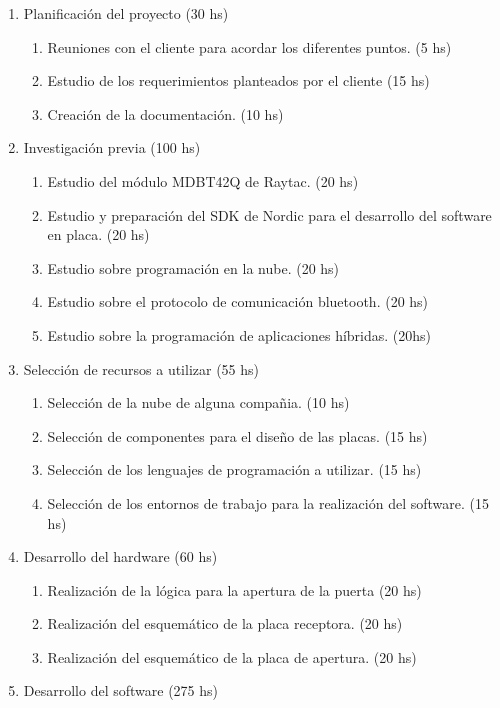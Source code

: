 \documentclass[11pt]{charter}
\begin{document}
\begin{enumerate}
\item Planificación del proyecto (30 hs)
	\begin{enumerate}
	\item Reuniones con el cliente para acordar los diferentes puntos. (5 hs)
	\item Estudio de los requerimientos planteados por el cliente (15 hs)
	\item Creación de la documentación. (10 hs)
	\end{enumerate}
\item Investigación previa (100 hs)
	\begin{enumerate}
	\item Estudio del módulo MDBT42Q de Raytac. (20 hs)
	\item Estudio y preparación del SDK de Nordic para el desarrollo del software en placa. (20 hs)
	\item Estudio sobre programación en la nube. (20 hs)
	\item Estudio sobre el protocolo de comunicación bluetooth. (20 hs)
	\item Estudio sobre la programación de aplicaciones híbridas. (20hs)
	\end{enumerate}
\item Selección de recursos a utilizar (55 hs)
	\begin{enumerate}
	\item Selección de la nube de alguna compañia. (10 hs)
	\item Selección de componentes para el diseño de las placas. (15 hs)
	\item Selección de los lenguajes de programación a utilizar. (15 hs)
	\item Selección de los entornos de trabajo para la realización del software. (15 hs)
	\end{enumerate}
\item Desarrollo del hardware (60 hs)
	\begin{enumerate}
	\item Realización de la lógica para la apertura de la puerta (20 hs)
	\item Realización del esquemático de la placa receptora. (20 hs)
	\item Realización del esquemático de la placa de apertura. (20 hs)
	\end{enumerate}
\item Desarrollo del software (275 hs)
	\begin{enumerate}

\end{enumerate}
\end{enumerate}
\end{document}

